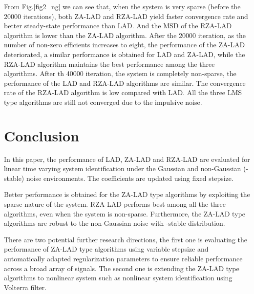 \documentclass[conference]{IEEEtran}
\begin{document}
From Fig.\ref{fig2_ng} we can see that, when the system is very sparse (before the 20000 iterations), both  ZA-LAD and RZA-LAD yield faster convergence rate and better steady-state performance than LAD. And the MSD of the RZA-LAD algorithm is lower than the ZA-LAD algorithm. After the 20000 iteration, as the number of non-zero efficients increases to eight, the performance of the ZA-LAD deteriorated, a similar performance is obtained for LAD and ZA-LAD, while the RZA-LAD algorithm maintains the best performance among the three algorithms. After th 40000 iteration, the system is completely non-sparse, the performance of the LAD and RZA-LAD algorithms are similar.
The convergence rate of the RZA-LAD algorithm is low compared with LAD.
All the three LMS type algorithms are still not converged due to the impulsive noise.
\section{Conclusion}
In this paper, the performance of LAD,  ZA-LAD and  RZA-LAD are evaluated for linear time varying system identification under the Gaussian and non-Gaussian (-stable)  noise environments. The coefficients are updated using fixed stepsize. 

Better performance is obtained for the ZA-LAD type algorithms by exploiting the sparse nature of the system. RZA-LAD performs best among all the three algorithms, even when the system is non-sparse. Furthermore, the ZA-LAD type algorithms are robust to the non-Gaussian noise with -stable distribution. 

There are two potential further research directions, the first one is evaluating the performance of ZA-LAD type algorithms using variable stepsize and automatically adapted regularization parameters to ensure reliable performance across a broad array of signals.
The second one is extending the ZA-LAD type algorithms to nonlinear system such as nonlinear system identification using Volterra filter.
\end{document}
